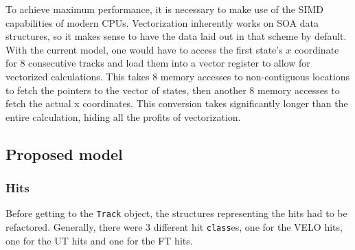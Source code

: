 \documentclass[12pt]{article}
\newcommand{\code}[1]{\texttt{#1}}
\begin{document}
To achieve maximum performance, it is necessary to make use of the SIMD capabilities of modern CPUs. Vectorization inherently works on SOA data structures, so it makes sense to have the data laid out in that scheme by default. With the current model, one would have to access the first state's $x$ coordinate for 8 consecutive tracks and load them into a vector register to allow for vectorized calculations. This takes 8 memory accesses to non-contiguous locations to fetch the pointers to the vector of states, then another 8 memory accesses to fetch the actual x coordinates. This conversion takes significantly longer than the entire calculation, hiding all the profits of vectorization.


\subsection{Proposed model}

\subsubsection{Hits}

Before getting to the \code{Track} object, the structures representing the hits had to be refactored. Generally, there were 3 different hit \code{class}es, one for the VELO hits, one for the UT hits and one for the FT hits.
\end{document}
